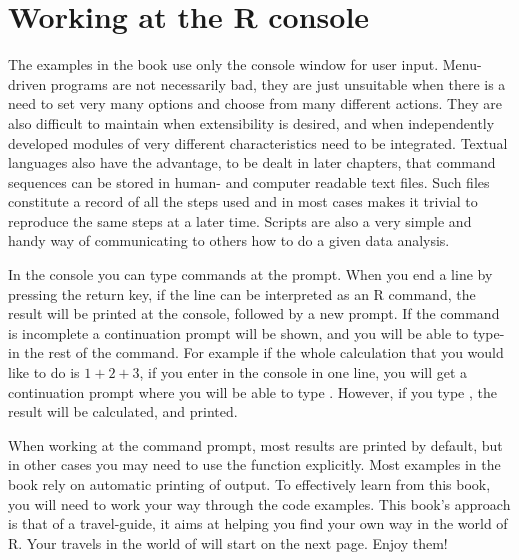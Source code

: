 \documentclass[krantz2,ChapterTOCs]{krantz}\usepackage{knitr}
\begin{document}
\section{Working at the R console}
The examples in the book use only the console window for user input. Menu-driven programs are not necessarily bad, they are just unsuitable when there is a need to set very many options and choose from many different actions. They are also difficult to maintain when extensibility is desired, and when independently developed modules of very different characteristics need to be integrated. Textual languages also have the advantage, to be dealt in later chapters, that command sequences can be stored in human- and computer readable text files. Such files constitute a record of all the steps used and in most cases makes it trivial to reproduce the same steps at a later time. Scripts are also a very simple and handy way of communicating to others how to do a given data analysis.

In the console you can type commands at the \code{>} prompt.
When you end a line by pressing the return key, if the line can be interpreted as an R command, the result will be printed at the console, followed by a new \code{>} prompt.
If the command is incomplete a \code{+} continuation prompt will be shown, and you will be able to type-in the rest of the command. For example if the whole calculation that you would like to do is $1 + 2 + 3$, if you enter in the console  in one line, you will get a continuation prompt where you will be able to type . However, if you type , the result will be calculated, and printed.

When working at the command prompt, most results are printed by default, but in other cases you may need to use the function  explicitly. Most examples in the book rely on automatic printing of output. To effectively learn from this book, you will need to work your way through the code examples. This book's approach is that of a travel-guide, it aims at helping you find your own way in the world of R. Your travels in the world of \Rlang will start on the next page. Enjoy them!
\end{document}
